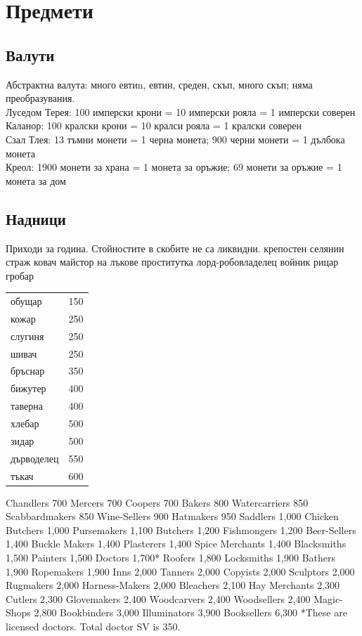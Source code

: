 \section{Предмети}
\subsection{Валути}
Абстрактна валута: много евтиn, евтин, среден, скъп, много скъп; няма преобразувания.  \\
Луседом Терея: 100 имперски крони = 10 имперски рояла = 1 имперски соверен             \\
Каланор: 100 кралски крони = 10 кралси рояла = 1 кралски соверен                       \\
Сзал Тлея: 13 тъмни монети = 1 черна монета; 900 черни монети = 1 дълбока монета       \\
Креол: 1900 монети за храна = 1 монета за оръжие; 69 монети за оръжие = 1 монета за дом

\subsection{Надници}
Приходи за година. Стойностите в скобите не са ликвидни.
крепостен селянин
страж
ковач
майстор на лъкове
проститутка
лорд-робовладелец
войник
рицар
гробар

\begin{tabular}{p{3cm} | p{2cm}}
обущар      & 150   \\
кожар       & 250   \\
слугиня     & 250   \\
шивач       & 250   \\
бръснар     & 350   \\
бижутер     & 400   \\
таверна     & 400   \\
хлебар      & 500   \\
зидар       & 500   \\
дърводелец  & 550   \\
тъкач       & 600   \\

\end{tabular}

Chandlers     700
Mercers     700
Coopers     700
Bakers                   800
Watercarriers     850
Scabbardmakers   850
Wine-Sellers     900
Hatmakers     950
Saddlers     1,000
Chicken Butchers  1,000
Pursemakers     1,100
Butchers     1,200
Fishmongers     1,200
Beer-Sellers     1,400
Buckle Makers     1,400
Plasterers     1,400
Spice Merchants   1,400
Blacksmiths     1,500
Painters     1,500
Doctors                   1,700*
Roofers       1,800
Locksmiths     1,900
Bathers                   1,900
Ropemakers     1,900
Inns                   2,000
Tanners                   2,000
Copyists    2,000
Sculptors    2,000
Rugmakers    2,000
Harness-Makers  2,000
Bleachers    2,100
Hay Merchants    2,300
Cutlers                  2,300
Glovemakers   2,400
Woodcarvers   2,400
Woodsellers   2,400
Magic-Shops   2,800
Bookbinders   3,000
Illuminators   3,900
Booksellers   6,300
*These are licensed doctors. Total doctor SV is 350.

